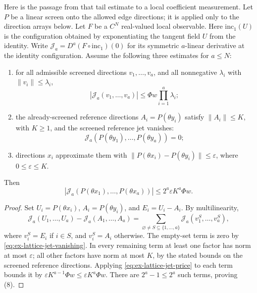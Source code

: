 \begin{lemma}
\label{lem:ex-lattice-jet-comparison}
Here is the passage from that tail estimate to a local coefficient
measurement. Let \(P\) be a linear screen onto the allowed edge
directions; it is applied only to the direction arrays below. Let \(F\) be
a \(C^N\) real-valued local observable. Here \(\mathrm{inc}_1(U)\) is the
configuration obtained by exponentiating the tangent field \(U\) from the
identity. Write
\(\mathcal J_a=D^a(F\circ\mathrm{inc}_1)(0)\) for its symmetric
\(a\)-linear derivative at the identity configuration. Assume the following
three estimates for \(a\le N\):
\begin{enumerate}
\item for all admissible screened directions \(v_1,\ldots,v_a\), and all
nonnegative \(\lambda_i\) with \(\|v_i\|\le\lambda_i\),
\begin{equation}
 |\mathcal J_a(v_1,\ldots,v_a)|
 \le \Phi w\prod_{i=1}^a\lambda_i;
 \label{eq:ex-lattice-jet-price}
\end{equation}
\item the already-screened reference directions \(A_i=P(\theta y_i)\)
satisfy \(\|A_i\|\le K\), with \(K\ge1\), and the screened reference jet
vanishes:
\begin{equation}
 \mathcal J_a(P(\theta y_1),\ldots,P(\theta y_a))=0;
 \label{eq:ex-lattice-jet-vanishing}
\end{equation}
\item directions \(x_i\) approximate them with
\(\|P(\theta x_i)-P(\theta y_i)\|\le\varepsilon\), where
\(0\le\varepsilon\le K\).
\end{enumerate}
Then
\begin{equation}
 |\mathcal J_a(P(\theta x_1),\ldots,P(\theta x_a))|
 \le 2^a\varepsilon K^a\Phi w.
 \label{eq:ex-lattice-jet-comparison}
\end{equation}
\end{lemma}
\begin{proof}
Set \(U_i=P(\theta x_i)\), \(A_i=P(\theta y_i)\), and
\(E_i=U_i-A_i\). By multilinearity,
\[
 \mathcal J_a(U_1,\ldots,U_a)-\mathcal J_a(A_1,\ldots,A_a)
 =\sum_{\varnothing\ne S\subseteq\{1,\ldots,a\}}
 \mathcal J_a(v_1^S,\ldots,v_a^S),
 \]
where \(v_i^S=E_i\) if \(i\in S\), and \(v_i^S=A_i\) otherwise.
The empty-set term is zero by \eqref{eq:ex-lattice-jet-vanishing}. In every remaining term at least one
factor has norm at most \(\varepsilon\); all other factors have norm at
most \(K\), by the stated bounds on the screened reference directions.
Applying \eqref{eq:ex-lattice-jet-price} to each term bounds it by
\(\varepsilon K^{a-1}\Phi w\le\varepsilon K^a\Phi w\).
There are \(2^a-1\le2^a\) such terms, proving (8).
\end{proof}

